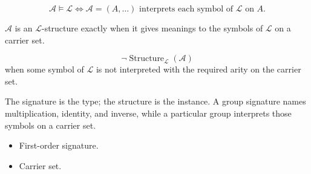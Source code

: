 \begin{remark*}
\[
\mathcal{A}\models\mathcal{L}
\Longleftrightarrow
\mathcal{A}=(A,\ldots)
\text{ interprets each symbol of }\mathcal{L}\text{ on }A.
\]
\end{remark*}

\begin{remark*}
$\mathcal{A}$ is an $\mathcal{L}$-structure exactly when it gives meanings to
the symbols of $\mathcal{L}$ on a carrier set.
\end{remark*}

\begin{remark*}
\[
\neg\operatorname{Structure}_{\mathcal{L}}(\mathcal{A})
\]
when some symbol of $\mathcal{L}$ is not interpreted with the required arity on
the carrier set.
\end{remark*}

\begin{remark*}[Interpretation]
The signature is the type; the structure is the instance.  A group signature
names multiplication, identity, and inverse, while a particular group
interprets those symbols on a carrier set.
\end{remark*}

\begin{remark*}[Dependencies]
\begin{itemize}
  \item First-order signature.
  \item Carrier set.
\end{itemize}
\end{remark*}
